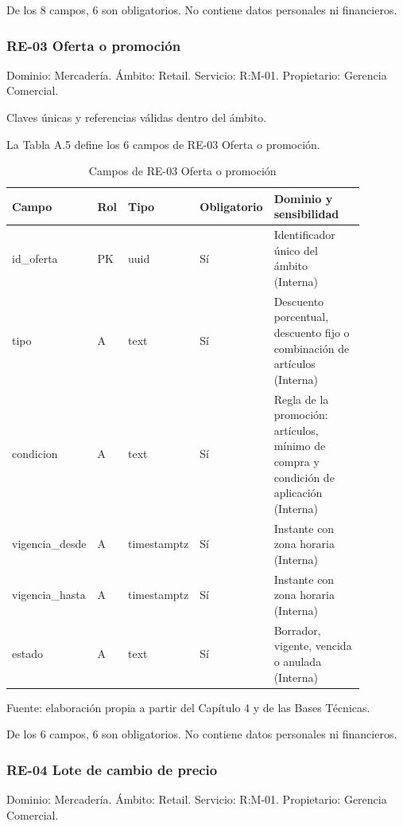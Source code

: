 \documentclass[11pt]{article}
\begin{document}
De los 8 campos, 6 son obligatorios. No contiene datos personales ni financieros.

\subsubsection{RE-03 Oferta o promoción}

Dominio: Mercadería. Ámbito: Retail. Servicio: R:M-01. Propietario: Gerencia Comercial.

Claves únicas y referencias válidas dentro del ámbito.

La Tabla A.5 define los 6 campos de RE-03 Oferta o promoción.

\begin{table}[htbp]
\caption{Campos de RE-03 Oferta o promoción}\label{tab:d_re03}
\centering
\begin{tabular}{@{}p{0.167\linewidth}p{0.070\linewidth}p{0.079\linewidth}p{0.097\linewidth}p{0.465\linewidth}@{}}
\toprule Campo & Rol & Tipo & Obligatorio & Dominio y sensibilidad \\
\midrule
id\_oferta & PK & uuid & Sí & Identificador único del ámbito (Interna) \\
tipo & A & text & Sí & Descuento porcentual, descuento fijo o combinación de artículos (Interna) \\
condicion & A & text & Sí & Regla de la promoción: artículos, mínimo de compra y condición de aplicación (Interna) \\
vigencia\_desde & A & timestamptz & Sí & Instante con zona horaria (Interna) \\
vigencia\_hasta & A & timestamptz & Sí & Instante con zona horaria (Interna) \\
estado & A & text & Sí & Borrador, vigente, vencida o anulada (Interna) \\
\bottomrule
\end{tabular}
\par\smallskip
{\raggedright Fuente: elaboración propia a partir del Capítulo 4 y de las Bases Técnicas.\par}
\end{table}


De los 6 campos, 6 son obligatorios. No contiene datos personales ni financieros.

\subsubsection{RE-04 Lote de cambio de precio}

Dominio: Mercadería. Ámbito: Retail. Servicio: R:M-01. Propietario: Gerencia Comercial.
\end{document}
